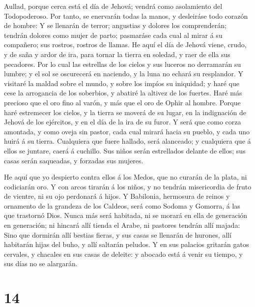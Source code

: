  Aullad, porque cerca está el día de Jehová; vendrá como
asolamiento del Todopoderoso.  Por tanto, se enervarán todas
la manos, y desleiráse todo corazón de hombre:  Y se
llenarán de terror; angustias y dolores los comprenderán; tendrán
dolores como mujer de parto; pasmaráse cada cual al mirar á su
compañero; sus rostros, rostros de llamas.  He aquí el día
de Jehová viene, crudo, y de saña y ardor de ira, para tornar la tierra
en soledad, y raer de ella sus pecadores.  Por lo cual las
estrellas de los cielos y sus luceros no derramarán su lumbre; y el sol
se oscurecerá en naciendo, y la luna no echará su resplandor.
 Y visitaré la maldad sobre el mundo, y sobre los impíos su
iniquidad; y haré que cese la arrogancia de los soberbios, y abatiré la
altivez de los fuertes.  Haré más precioso que el oro fino
al varón, y más que el oro de Ophir al hombre.  Porque haré
estremecer los cielos, y la tierra se moverá de su lugar, en la
indignación de Jehová de los ejércitos, y en el día de la ira de su
furor.  Y será que como corza amontada, y como oveja sin
pastor, cada cual mirará hacia su pueblo, y cada uno huirá á su tierra.
 Cualquiera que fuere hallado, será alanceado; y cualquiera
que á ellos se juntare, caerá á cuchillo.  Sus niños serán
estrellados delante de ellos; sus casas serán saqueadas, y forzadas sus
mujeres.

 He aquí que yo despierto contra ellos á los Medos, que no
curarán de la plata, ni codiciarán oro.  Y con arcos
tirarán á los niños, y no tendrán misericordia de fruto de vientre, ni
su ojo perdonará á hijos.  Y Babilonia, hermosura de reinos
y ornamento de la grandeza de los Caldeos, será como Sodoma y Gomorra, á
las que trastornó Dios.  Nunca más será habitada, ni se
morará en ella de generación en generación; ni hincará allí tienda el
Arabe, ni pastores tendrán allí majada:  Sino que dormirán
allí bestias fieras, y sus casas se llenarán de hurones, allí habitarán
hijas del buho, y allí saltarán peludos.  Y en sus palacios
gritarán gatos cervales, y chacales en sus casas de deleite: y abocado
está á venir su tiempo, y sus días no se alargarán.

\hypertarget{section-13}{%
\section{14}\label{section-13}}

